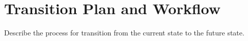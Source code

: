 \section{Transition Plan and Workflow}

Describe the process for transition from the current state to the future state.
